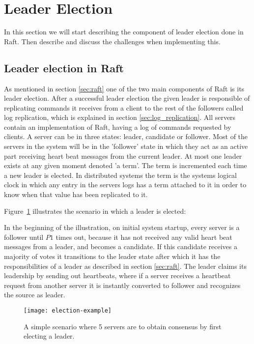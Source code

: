 \section{Leader Election} %
\label{sec:leader_election}
In this section we will start describing the component of leader election done in Raft. Then describe and discuss the challenges when implementing this.

\subsection{Leader election in Raft}
As mentioned in section \ref{sec:raft} one of the two main components of Raft is its leader election. After a successful leader election the given leader is responsible of replicating commands it receives from a client to the rest of the followers called log replication, which is explained in section \ref{sec:log_replication}. All servers contain an implementation of Raft, having a log of commands requested by clients. A server can be in three states: leader, candidate or follower. Most of the servers in the system will be in the 'follower' state in which they act as an active part receiving heart beat messages from the current leader. At most one leader exists at any given moment denoted 'a term'. The term is incremented each time a new leader is elected. In distributed systems the term is the systems logical clock in which any entry in the servers logs has a term attached to it in order to know when that value has been replicated to it.

Figure~\ref{fig:election_example} illustrates the scenario in which a leader is elected:

In the beginning of the illustration, on initial system startup, every server is a follower until $P1$ times out, because it has not received any valid heart beat messages from a leader, and becomes a candidate. If this candidate receives a majority of votes it transitions to the leader state after which it has the responsibilities of a leader as described in section \ref{sec:raft}. The leader claims its leadership by sending out heartbeats, where if a server receives a heartbeat request from another server it is instantly converted to follower and recognizes the source as leader.

\begin{figure}[ht!]
\centering
\texttt{[image: election-example]}
\caption{A simple scenario where 5 servers are to obtain consensus by first electing a leader.}
\label{fig:election_example}
\end{figure}

